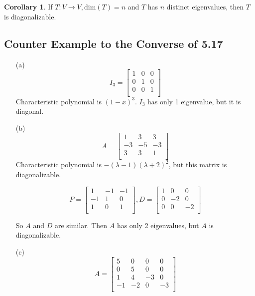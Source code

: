 \documentclass[a4paper,10pt]{article}
\theoremstyle{definition}
\newtheorem{corollary}{Corollary}[theorem]
\begin{document}
\subsection{}
\begin{corollary}
	If $T : V \to V, \text{dim}(T) = n$ and $T$ has $n$ distinct eigenvalues,
	then $T$ is diagonalizable.
\end{corollary}

\subsection{Counter Example to the Converse of 5.17}
\begin{enumerate}
	\item[(a)] $$I_3 =
		\begin{bmatrix}
			1 &0  &0  \\
			0 &1  &0  \\
			0 &0  &1  \\
		\end{bmatrix}
		$$
		Characteristic polynomial is $(1-x)^3$. $I_3$ has only 1 eigenvalue, but it is
		diagonal.
	
	\item[(b)] 
		$$A=
		\begin{bmatrix}
			1 & 3 & 3 \\
			-3 & -5 & -3 \\
			3 & 3 & 1 \\
		\end{bmatrix}
		$$
		Characteristic polynomial is $-(\lambda - 1)(\lambda+2)^2$, but this
		matrix is diagonalizable.

		$$P=
		\begin{bmatrix}
			1 & -1 & -1 \\
			-1 & 1 & 0 \\
			1 & 0 & 1 \\
		\end{bmatrix}
		,
		D = 
		\begin{bmatrix}
			1 & 0 & 0 \\
			0 & -2 & 0 \\
			0 & 0 & -2 \\
		\end{bmatrix}
		$$

		So $A$ and $D$ are similar. Then $A$ has only 2 eigenvalues, but $A$ is
		diagonalizable.

	\item[(c)]
		$$A = 
		\begin{bmatrix}
			5 & 0 & 0 & 0 \\
			0 & 5 & 0 & 0 \\
			1 & 4 & -3 & 0 \\
			-1 & -2 & 0 & -3 \\
		\end{bmatrix}
		$$


\end{enumerate}
\end{document}
